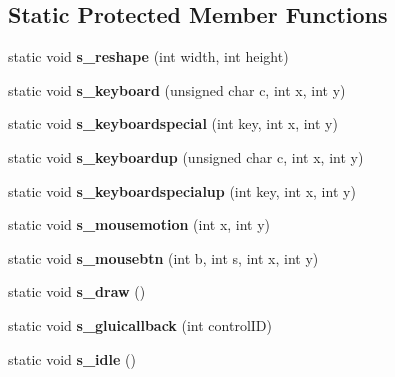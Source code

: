 \subsection*{Static Protected Member Functions}
\begin{DoxyCompactItemize}
\item 
static void {\bfseries s\+\_\+reshape} (int width, int height)\hypertarget{classBaseGfxApp_a5fe6a77d37044cbe28647ed3391bbb7a}{}\label{classBaseGfxApp_a5fe6a77d37044cbe28647ed3391bbb7a}

\item 
static void {\bfseries s\+\_\+keyboard} (unsigned char c, int x, int y)\hypertarget{classBaseGfxApp_a52edb2569227319feb68779844e7d857}{}\label{classBaseGfxApp_a52edb2569227319feb68779844e7d857}

\item 
static void {\bfseries s\+\_\+keyboardspecial} (int key, int x, int y)\hypertarget{classBaseGfxApp_a1e8d90a4faab60300ddf2a4ea9b83115}{}\label{classBaseGfxApp_a1e8d90a4faab60300ddf2a4ea9b83115}

\item 
static void {\bfseries s\+\_\+keyboardup} (unsigned char c, int x, int y)\hypertarget{classBaseGfxApp_aa1ca205af9d6cee33949f2e6adf4c923}{}\label{classBaseGfxApp_aa1ca205af9d6cee33949f2e6adf4c923}

\item 
static void {\bfseries s\+\_\+keyboardspecialup} (int key, int x, int y)\hypertarget{classBaseGfxApp_a0e4dfe006f3cc9126c1cc8ad32784f75}{}\label{classBaseGfxApp_a0e4dfe006f3cc9126c1cc8ad32784f75}

\item 
static void {\bfseries s\+\_\+mousemotion} (int x, int y)\hypertarget{classBaseGfxApp_a5e640f2394f7e038d0dd2b469d5c2e24}{}\label{classBaseGfxApp_a5e640f2394f7e038d0dd2b469d5c2e24}

\item 
static void {\bfseries s\+\_\+mousebtn} (int b, int s, int x, int y)\hypertarget{classBaseGfxApp_a22dd953bfb75add9fd0f8f2f8be535c5}{}\label{classBaseGfxApp_a22dd953bfb75add9fd0f8f2f8be535c5}

\item 
static void {\bfseries s\+\_\+draw} ()\hypertarget{classBaseGfxApp_a58415c6151a2a80e1fe2eaa9919a4dab}{}\label{classBaseGfxApp_a58415c6151a2a80e1fe2eaa9919a4dab}

\item 
static void {\bfseries s\+\_\+gluicallback} (int control\+ID)\hypertarget{classBaseGfxApp_ad4a963321f1147d68369225ab0c7f32f}{}\label{classBaseGfxApp_ad4a963321f1147d68369225ab0c7f32f}

\item 
static void {\bfseries s\+\_\+idle} ()\hypertarget{classBaseGfxApp_a272a9972092bed14572b0cff94415963}{}\label{classBaseGfxApp_a272a9972092bed14572b0cff94415963}

\end{DoxyCompactItemize}
